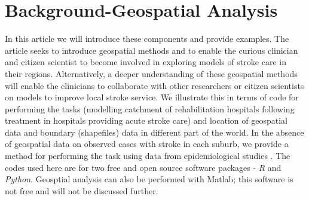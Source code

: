 \documentclass[utf8]{frontiersHLTH}
\begin{document}


\section{Background-Geospatial Analysis}\label{background}

In this article we will introduce these components and provide
examples. The article seeks to introduce geospatial methods and to
enable the curious clinician and citizen scientist to become involved
in exploring models of stroke care in their regions. Alternatively, a deeper understanding of these geospatial methods will enable the clinicians to collaborate with other researchers or citizen scientists on models to improve local stroke service. We illustrate
this in terms of code for performing the tasks (modelling catchment of
rehabilitation hospitals following treatment in hospitals providing
acute stroke care) and location of geospatial data and boundary
(shapefiles) data in different part of the world. In the absence of
geospatial data on observed cases with stroke in each suburb, we
provide a method for performing the task using data from
epidemiological studies \cite{Phan_2017}. The codes used here are for
two free and open source software packages - {\em R} and {\em
  Python}. Geosptial analysis can also be performed with
Matlab\cite{Milne_2017}; this software is not free and will not be
discussed further.
\end{document}
